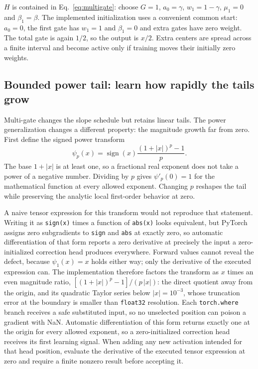 \documentclass[10pt,aps,prd,twocolumn,nofootinbib]{revtex4-2}
\newcommand{\code}[1]{\texttt{#1}}
\begin{document}
\(H\) is contained in Eq.~\eqref{eq:multigate}: choose \(G=1\),
\(a_0=\gamma\), \(w_1=1-\gamma\), \(\mu_1=0\) and
\(\beta_1=\beta\).  The implemented initialization uses a convenient
common start: \(a_0=0\), the first gate has \(w_1=1\) and \(\beta_1=0\) and
extra gates have zero weight.  The total gate is again \(1/2\), so the output
is \(x/2\).  Extra centers are spread across a finite interval and become
active only if training moves their initially zero weights.

\subsection{Bounded power tail: learn how rapidly the tails grow}

Multi-gate changes the slope schedule but retains linear tails.  The power
generalization changes a different property: the magnitude growth far from
zero.  First define the signed power transform
\begin{equation}
 \psi_p(x)=\operatorname{sign}(x)
 \frac{(1+|x|)^p-1}{p}.
 \label{eq:psi}
\end{equation}
The base \(1+|x|\) is at least one, so a fractional real exponent does not
take a power of a negative number.  Dividing by $p$ gives
$\psi'_p(0)=1$ for the mathematical function at every allowed exponent.
Changing $p$ reshapes the tail while preserving the analytic
local first-order behavior at zero.

A naive tensor expression for this transform would not reproduce that
statement.  Writing it as \code{sign(x)} times a function of \code{abs(x)}
looks equivalent, but PyTorch assigns zero subgradients to \code{sign} and
\code{abs} at exactly zero, so automatic differentiation of that form
reports a zero derivative at precisely the input a zero-initialized
correction head produces everywhere.  Forward values cannot reveal the
defect, because $\psi_1(x)=x$ holds either way; only the derivative of the
executed expression can.  The implementation therefore factors the
transform as $x$ times an even magnitude ratio,
$\left[(1+|x|)^p-1\right]/(p\,|x|)$: the direct quotient away from the
origin, and its quadratic Taylor series below $|x|=10^{-3}$, whose
truncation error at the boundary is smaller than \code{float32}
resolution.  Each \code{torch.where} branch receives a safe substituted
input, so no unselected position can poison a gradient with NaN.
Automatic differentiation of this form returns exactly one at the origin
for every allowed exponent, so a zero-initialized correction head receives
its first learning signal.  When adding any new activation intended for
that head position, evaluate the derivative of the executed tensor
expression at zero and require a finite nonzero result before accepting
it.
\end{document}
